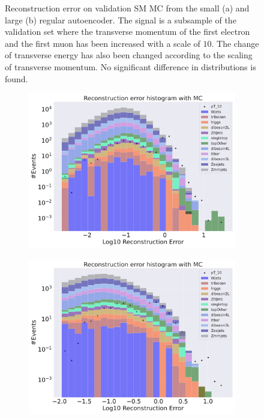 \begin{figure}[H]
\begin{subfigure}{.45\textwidth}
        \caption{}
        \label{fig:ae_big_pt_10}
    \end{subfigure}
    \hfill 
    \caption[AE | Reconstruction error $p_T$ altering of 10]{Reconstruction error on validation SM MC from the small (a) and large (b) regular autoencoder. The signal is a subsample of the validation 
    set where the transverse momentum of the first electron and the first muon has been increased with a scale of $10$. The change of transverse 
    energy has also been changed according to the scaling of transverse momentum. No significant difference in distributions is found. }
    \label{fig:ae_big_small_pt_10}
\end{figure}




\begin{figure}[H]
    \centering
    \begin{subfigure}{.45\textwidth}
        \includegraphics[width=\textwidth]{Figures/VAE_testing/small/b_data_recon_big_rm3_feats_sig_pT_10.pdf}
        \caption{ }
        \label{fig:VAE_small_pt_10}
    \end{subfigure}
    \hfill 
    \begin{subfigure}{.45\textwidth}
        \includegraphics[width=\textwidth]{Figures/VAE_testing/big/b_data_recon_big_rm3_feats_sig_pT_10.pdf}

\end{subfigure}
\end{figure}
